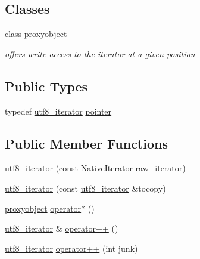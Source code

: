 \subsection*{Classes}
\begin{DoxyCompactItemize}
\item 
class \hyperlink{classu5e_1_1utf8__iterator_1_1proxyobject}{proxyobject}
\begin{DoxyCompactList}\small\item\em offers write access to the iterator at a given position \end{DoxyCompactList}\end{DoxyCompactItemize}
\subsection*{Public Types}
\begin{DoxyCompactItemize}
\item 
typedef \hyperlink{classu5e_1_1utf8__iterator}{utf8\+\_\+iterator} \hyperlink{classu5e_1_1utf8__iterator_a7f50a43350790b6f213e83427f8bb8b7}{pointer}
\end{DoxyCompactItemize}
\subsection*{Public Member Functions}
\begin{DoxyCompactItemize}
\item 
\hyperlink{classu5e_1_1utf8__iterator_ad50264ff5f219e7d7606c7b4d4bf8a3b}{utf8\+\_\+iterator} (const Native\+Iterator raw\+\_\+iterator)
\item 
\hyperlink{classu5e_1_1utf8__iterator_acea20d0f74e2cd7f04d7b6f5e41a2e18}{utf8\+\_\+iterator} (const \hyperlink{classu5e_1_1utf8__iterator}{utf8\+\_\+iterator} \&tocopy)
\item 
\hyperlink{classu5e_1_1utf8__iterator_1_1proxyobject}{proxyobject} \hyperlink{classu5e_1_1utf8__iterator_acdfcb12b677372e6ff72b72740f489e4}{operator$\ast$} ()
\end{DoxyCompactItemize}
{\bf }\par
\begin{DoxyCompactItemize}
\item 
\hyperlink{classu5e_1_1utf8__iterator}{utf8\+\_\+iterator} \& \hyperlink{classu5e_1_1utf8__iterator_ab6431e6ba7010f9fd7a1eba079022781}{operator++} ()
\item 
\hyperlink{classu5e_1_1utf8__iterator}{utf8\+\_\+iterator} \hyperlink{classu5e_1_1utf8__iterator_a13fba9b49f844b9b1929e46a9bb8d4e8}{operator++} (int junk)
\end{DoxyCompactItemize}

